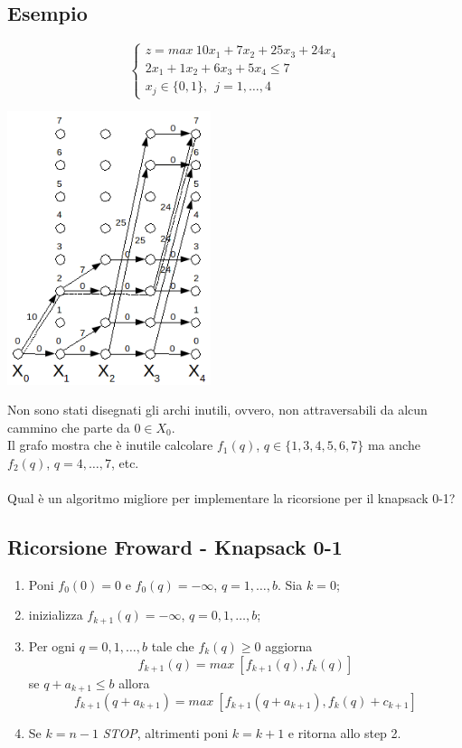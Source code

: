 \subsection{Esempio}
\begin{equation*}
	\begin{cases}
		z=max\ 10x_{1}+7x_{2}+25x_{3}+24x_{4} \\
		2x_{1}+1x_{2}+6x_{3}+5x_{4}\le 7 \\
		x_{j}\in\{0,1\},\ \ j=1,\dots,4
	\end{cases}
\end{equation*}
\centerline{\includegraphics[height=8cm]{images/graph40.png}}
Non sono stati disegnati gli archi inutili, ovvero, non attraversabili da alcun cammino che parte da $0\in X_{0}$.\\
Il grafo mostra che è inutile calcolare $f_{1}(q)$, $q\in\{1,3,4,5,6,7\}$ ma anche $f_{2}(q)$, $q=4,\dots,7$, etc.\\\\
Qual è un algoritmo migliore per implementare la ricorsione per il knapsack 0-1?

\subsection{Ricorsione Froward - Knapsack 0-1}
\begin{enumerate}
	\item Poni $f_{0}(0)=0$ e $f_{0}(q)=-\infty$, $q=1,\dots,b$. Sia $k=0$;
	\item inizializza $f_{k+1}(q)=-\infty$, $q=0,1,\dots,b$;
	\item Per ogni $q=0,1,\dots,b$ tale che $f_{k}(q)\ge 0$ aggiorna 
	\begin{equation*}
		f_{k+1}(q)=max\ [f_{k+1}(q),f_{k}(q)] 
	\end{equation*}
	se $q+a_{k+1}\le b$ allora
	\begin{equation*}
		f_{k+1}(q+a_{k+1})=max\ [f_{k+1}(q+a_{k+1}),f_{k}(q)+c_{k+1}]
	\end{equation*}
	\item Se $k=n-1$ \textit{STOP}, altrimenti poni $k=k+1$ e ritorna allo step 2.
\end{enumerate}

